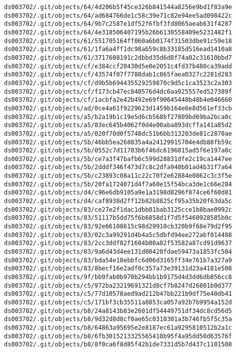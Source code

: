 \documentclass[11pt]{article}
\begin{document}
\begin{Verbatim}[commandchars=\\\{\}]
ds003702/.git/objects/64/4d206b5f45ce326b841544a8256e9bd1f83a9e
ds003702/.git/objects/64/ad684766de1c58c39e71c82e94ee5ad098422c
ds003702/.git/objects/64/9b7c2587e1df52f6fbf3fd8065aeab631f4287
ds003702/.git/objects/64/4e318506407195b26b6130558409e5231482f1
ds003702/.git/objects/61/551705164ff060a6b0174f31503dbe91c59e18
ds003702/.git/objects/61/1fa6a4ff1dc98ab59c8b33185d516ead1410a8
ds003702/.git/objects/61/3717608191c2dbbd35d6d8f74a02c31610bbd7
ds003702/.git/objects/cf/e384ccf20430d5e0e2051c4fd37b480ca39add
ds003702/.git/objects/cf/43574f07f7788dab1c865faea0327c2281d283
ds003702/.git/objects/cf/d9b5b694435529259870c9d5c1ca3523c2a303
ds003702/.git/objects/cf/f173cb47ec840576d4dc6aa925557ed527389f
ds003702/.git/objects/cf/1acbfa2e42b492e69f90645448b48b4e046660
ds003702/.git/objects/ad/0ce4a61f9229623d1459b164e6e8d561ef33cb
ds003702/.git/objects/a5/b2a19b1c19e5d6cb568bf27809bd69ba2bca0c
ds003702/.git/objects/a5/83ec645b4062f0d4e00aba893dcffa141a85d2
ds003702/.git/objects/a5/020f70d0f5748dc51b6bb313203de81c2870ae
ds003702/.git/objects/5b/46bb5ea268835a4a24129915704e4db88fb59c
ds003702/.git/objects/5b/0552c7d11703b6f46dc6196815ad5f6e197a0c
ds003702/.git/objects/5b/ce7a3f47bafb6c599d28831dfe2c19ca1447ee
ds003702/.git/objects/5b/2dddf346f473d7c8c2dfa940b01ad4b31f7a64
ds003702/.git/objects/5b/c23893c08a11c22c70f2e62884e0862c3c3f5e
ds003702/.git/objects/5b/20fa1724071d4f7a60e15f54bca3de1c66e284
ds003702/.git/objects/d4/c96e6db9105a9e1a3198d8296f874ce6f60d81
ds003702/.git/objects/d4/caf8938d2ff12b82b8825cf95a35b20f63da5c
ds003702/.git/objects/83/ce27e2f1dac1dbb01bab3125cce1b8bae0992c
ds003702/.git/objects/83/51117b5dd75f6b6858d1f7d5f5460928585b0c
ds003702/.git/objects/83/92e66108615c98d29910cb320b9f68e79d2f95
ds003702/.git/objects/83/02c3a99291d4b4a5c5dbfd94ee272abf014488
ds003702/.git/objects/83/2cc3ddf82f1604b00a82f53582a87cd91d9637
ds003702/.git/objects/83/9a6d43d4ee131d00420fdae59473a1853fc504
ds003702/.git/objects/83/bda54e18ebbfc6d06d3165ff34e761b7a327a9
ds003702/.git/objects/83/8becf16e2adf0c357a73e39131d23a4181e508
ds003702/.git/objects/9f/bb9fab0b970b294bb1b9175d4d3dd6db856cc8
ds003702/.git/objects/c5/972ba23219691321d8cf7b8247d26801b0d377
ds003702/.git/objects/c5/77d10578aed9ad212b47bb221b9df75e40db41
ds003702/.git/objects/c5/171bf3cb35511a8853ca057a92b7b9954a152d
ds003702/.git/objects/b8/24a8143b83e2601df54449751df34dc8cd56d5
ds003702/.git/objects/b8/9d32d8d8cf0ae65c0310301a3b746fb5f5c35a
ds003702/.git/objects/b8/64863a95695e2e8187ec61a9295810512b2a1c
ds003702/.git/objects/b8/6fb3015213325565410b95f4a95dd50d63576f
ds003702/.git/objects/b8/8f0ca6f8d85f42b1de7331d5b7d437c1101508

\end{Verbatim}
\end{document}
